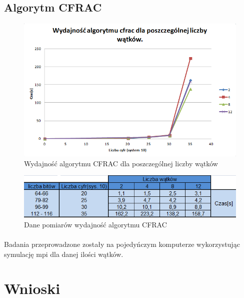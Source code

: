 \documentclass{article}
\begin{document}
\subsection{Algorytm CFRAC}
\begin{figure}[h]
    \centering
    \includegraphics[width=1.0\textwidth]{cfracWydajnosc.png}
    \caption{Wydajność algorytmu CFRAC dla poszczególnej liczby wątków}
    \label{fig:cfracWykres}
\end{figure}
\begin{figure}[h]
    \centering
    \includegraphics[width=1.0\textwidth]{cfracWydajnoscTabela.png}
    \caption{Dane pomiarów wydajność algorytmu CFRAC}
    \label{fig:cfracTabela}
\end{figure}
\paragraph{}Badania przeprowadzone zostały na pojedyńczym komputerze wykorzystując symulację mpi dla danej ilości wątków.

\section{Wnioski}
\end{document}
